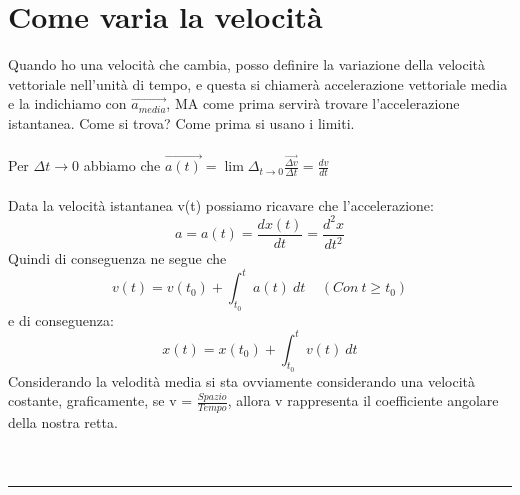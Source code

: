 \documentclass[12pt, a4paper, openany, oneside]{book}
\begin{document}
\section{Come varia la velocità}
Quando ho una velocità che cambia, posso definire la variazione della velocità 
vettoriale nell'unità di tempo, e questa si chiamerà accelerazione vettoriale media
e la indichiamo con $\vec{a_{media}}$, MA come prima servirà trovare l'accelerazione 
istantanea. Come si trova? Come prima si usano i limiti.
\\ \\
Per $\Delta t \to 0$ abbiamo che $\vec{a(t)} = \lim{\Delta _{t \to 0}} 
\frac{\vec{\Delta v}}{\Delta t} = \frac{dv}{dt} $
\\ \\
Data la velocità istantanea v(t) possiamo ricavare che l'accelerazione: 
\[a = a(t) = \frac{d x(t)}{dt} = \frac{d^{2}x}{dt^{2}}\]
Quindi di conseguenza ne segue che 
\[v(t) = v(t_{0}) + \int_{t_{0}}^{t}a(t)~dt ~~~~~ (Con ~ t\geq t_{0}) \] e
di conseguenza: \[x(t) = x(t_{0}) + \int_{t_{0}}^{t}v(t)~dt  \]
Considerando la velodità media si sta ovviamente considerando una velocità costante, 
graficamente, se v = $\frac{Spazio}{Tempo}$, allora v rappresenta il coefficiente
angolare della nostra retta.\\ \\ 
\\
{\color{black} \rule{\linewidth}{0.3mm}}
\end{document}
